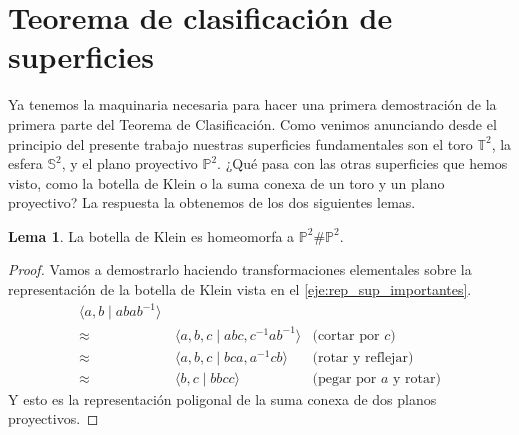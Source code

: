 \documentclass[10pt]{report}
\newcommand{\Esfera}{\mathbb{S}^2}
\newcommand{\Toro}{\mathbb{T}^2}
\newcommand{\Proyectivo}{\mathbb{P}^2}
\theoremstyle{definition}
\newtheorem{lema}[defin]{Lema}
\begin{document}
\section{Teorema de clasificación de superficies}\label{sec:tcs}

Ya tenemos la maquinaria necesaria para hacer una primera demostración de la primera parte del Teorema de Clasificación.
Como venimos anunciando desde el principio del presente trabajo nuestras superficies fundamentales son el toro $\Toro$, la esfera $ \Esfera$, y el plano proyectivo  $\Proyectivo$. ¿Qué pasa con las otras superficies que hemos visto, como la botella de Klein o la suma conexa de un toro y un plano proyectivo? La respuesta la obtenemos de los dos siguientes lemas.

\begin{lema}\label{lema:klein_proyectivoproyectivo}
La botella de Klein es homeomorfa a $\Proyectivo \# \Proyectivo$.
\end{lema}
\begin{proof}
Vamos a demostrarlo haciendo transformaciones elementales sobre la representación de la botella de Klein vista en el \autoref{eje:rep_sup_importantes}. 
\begin{align*}
\langle a,b\mid abab^{-1}\rangle & & \\
\approx & \, \langle a,b,c\mid abc, c^{-1}ab^{-1}\rangle &\text{(cortar por } c\text{)}\\
\approx & \, \langle a,b,c\mid bca,a^{-1}cb\rangle &\text{(rotar y reflejar)}\\
\approx & \, \langle b,c\mid bbcc\rangle &\text{(pegar por } a \text{ y rotar)}
\end{align*}
Y esto es la representación poligonal de la suma conexa de dos planos proyectivos.
\end{proof}
\end{document}

